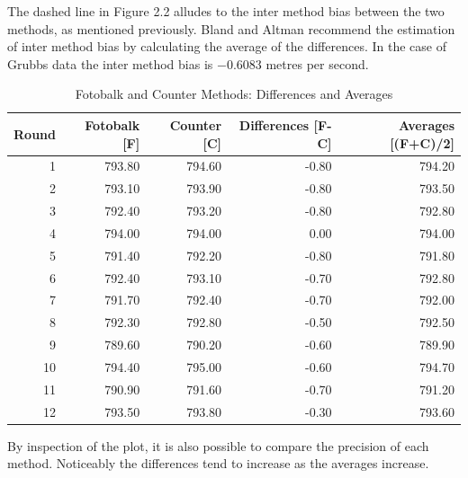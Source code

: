 \documentclass[12pt, a4paper]{report}
\theoremstyle{plain}
\theoremstyle{definition}
\theoremstyle{remark}
\begin{document}
	
	The dashed line in Figure 2.2 alludes to the inter method bias
	between the two methods, as mentioned previously. Bland and Altman
	recommend the estimation of inter method bias by calculating the
	average of the differences. In the case of Grubbs data the inter
	method bias is $-0.6083$ metres per second.
	\newpage
	
	\begin{table}[tbh]
		\begin{center}
			
			\begin{tabular}{rrrrr}
				\hline
				Round & Fotobalk [F] & Counter [C] & Differences [F-C] & Averages [(F+C)/2] \\
				\hline
				1 & 793.80 & 794.60 & -0.80 & 794.20 \\
				2 & 793.10 & 793.90 & -0.80 & 793.50 \\
				3 & 792.40 & 793.20 & -0.80 & 792.80 \\
				4 & 794.00 & 794.00 & 0.00 & 794.00 \\
				5 & 791.40 & 792.20 & -0.80 & 791.80 \\
				6 & 792.40 & 793.10 & -0.70 & 792.80 \\
				7 & 791.70 & 792.40 & -0.70 & 792.00 \\
				8 & 792.30 & 792.80 & -0.50 & 792.50 \\
				9 & 789.60 & 790.20 & -0.60 & 789.90 \\
				10 & 794.40 & 795.00 & -0.60 & 794.70 \\
				11 & 790.90 & 791.60 & -0.70 & 791.20 \\
				12 & 793.50 & 793.80 & -0.30 & 793.60 \\
				\hline
			\end{tabular}
			\caption{Fotobalk and Counter Methods: Differences and Averages}
		\end{center}
	\end{table}
	
	
	
	By inspection of the plot, it is also possible to compare the
	precision of each method. Noticeably the differences tend to
	increase as the averages increase.
	
\end{document}
